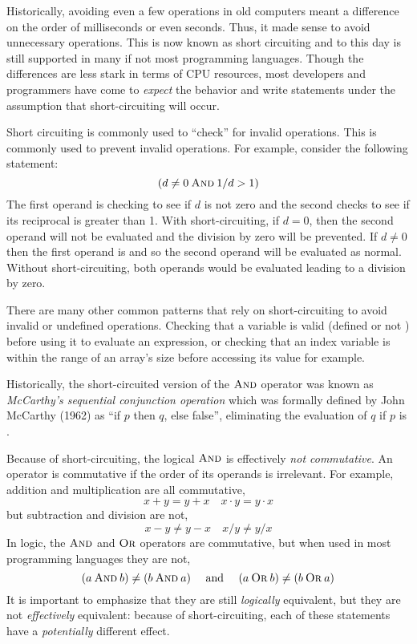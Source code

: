 Historically, avoiding even a few operations in old computers meant a difference on the
order of milliseconds or even seconds.  Thus, it made sense to avoid unnecessary
operations.  This is now known as \gls{short circuiting} and to this day is still supported
in many if not most programming languages.  Though the differences are less stark in
terms of CPU resources, most developers and programmers have come to \emph{expect}
the behavior and write statements under the assumption that short-circuiting will occur.

Short circuiting is commonly used to ``check'' for invalid operations.  This is commonly 
used to prevent invalid operations.  For example, consider the following statement:
  $$(d \neq 0 \mathbin{\textsc{And}} 1 / d > 1)$$
The first operand is checking to see if $d$ is not zero and the second checks to see if
its reciprocal is greater than 1.  With short-circuiting, if $d = 0$, then the second operand
will not be evaluated and the division by zero will be prevented.  If $d \neq 0$ then the
first operand is \True and so the second operand will be evaluated as normal.  Without
short-circuiting, both operands would be evaluated leading to a division by zero.

There are many other common patterns that rely on short-circuiting to avoid invalid
or undefined operations.  Checking that a variable is valid (defined or not \Null) before
using it to evaluate an expression, or checking that an index variable is within the 
range of an array's size before accessing its value for example.  

Historically, the short-circuited version of the $\mathbin{\textsc{And}}$ operator was known as 
\emph{McCarthy's sequential conjunction operation} which was formally defined 
by John McCarthy (1962) as ``if $p$ then $q$, else false'', eliminating the evaluation
of $q$ if $p$ is \False \cite{Mccarthy62towardsa}.  

Because of short-circuiting, the logical $\mathbin{\textsc{And}}$ is effectively \emph{not commutative}.
An operator is commutative if the order of its operands is irrelevant.  For example, 
addition and multiplication are all commutative, 
  $$x + y = y + x \quad x \cdot y = y \cdot x$$
but subtraction and division are not, 
  $$x - y \neq y - x \quad x / y \neq y / x$$
In logic, the $\mathbin{\textsc{And}}$ and $\mathbin{\textsc{Or}}$ operators are commutative, but when used in most
programming languages they are not, 
  $$(a \mathbin{\textsc{And}} b) \neq (b \mathbin{\textsc{And}} a) \quad \textrm{ and } \quad (a \mathbin{\textsc{Or}} b) \neq (b \mathbin{\textsc{Or}} a)$$
It is important to emphasize that they are still \emph{logically} equivalent, but they
are not \emph{effectively} equivalent: because of short-circuiting, each of these
statements have a \emph{potentially} different effect.

